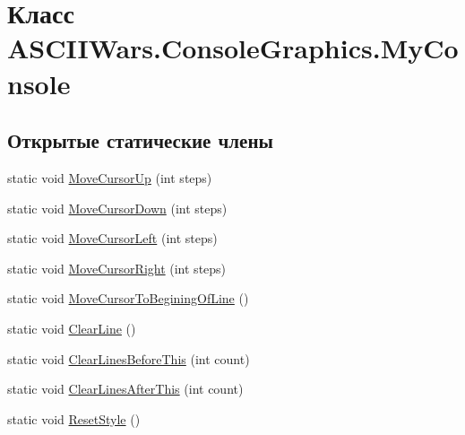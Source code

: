 \hypertarget{class_a_s_c_i_i_wars_1_1_console_graphics_1_1_my_console}{}\section{Класс A\+S\+C\+I\+I\+Wars.\+Console\+Graphics.\+My\+Console}
\label{class_a_s_c_i_i_wars_1_1_console_graphics_1_1_my_console}
\subsection*{Открытые статические члены}
\begin{DoxyCompactItemize}
\item 
static void \hyperlink{class_a_s_c_i_i_wars_1_1_console_graphics_1_1_my_console_ac514523e267519ad39f15457b948112f}{Move\+Cursor\+Up} (int steps)
\item 
static void \hyperlink{class_a_s_c_i_i_wars_1_1_console_graphics_1_1_my_console_aa22019c9afb2464aa8a1adbfacf2e979}{Move\+Cursor\+Down} (int steps)
\item 
static void \hyperlink{class_a_s_c_i_i_wars_1_1_console_graphics_1_1_my_console_a0dab60fcee6c6b175a913e5d6d9f8c95}{Move\+Cursor\+Left} (int steps)
\item 
static void \hyperlink{class_a_s_c_i_i_wars_1_1_console_graphics_1_1_my_console_adfccb3e8bafbe5d101a743cba7c05f43}{Move\+Cursor\+Right} (int steps)
\item 
static void \hyperlink{class_a_s_c_i_i_wars_1_1_console_graphics_1_1_my_console_a77af8cdcc9b62a3dccf066db376c8c57}{Move\+Cursor\+To\+Begining\+Of\+Line} ()
\item 
static void \hyperlink{class_a_s_c_i_i_wars_1_1_console_graphics_1_1_my_console_ac04c03e53cde550f545e47e737f49f35}{Clear\+Line} ()
\item 
static void \hyperlink{class_a_s_c_i_i_wars_1_1_console_graphics_1_1_my_console_a91b08048e9ead381257e4cf467c933b2}{Clear\+Lines\+Before\+This} (int count)
\item 
static void \hyperlink{class_a_s_c_i_i_wars_1_1_console_graphics_1_1_my_console_af3ba9de0fa9edae1a2a4bb7d8466a389}{Clear\+Lines\+After\+This} (int count)
\item 
static void \hyperlink{class_a_s_c_i_i_wars_1_1_console_graphics_1_1_my_console_aaf8beb7ac6983ccf63473d92398173a6}{Reset\+Style} ()
\end{DoxyCompactItemize}
